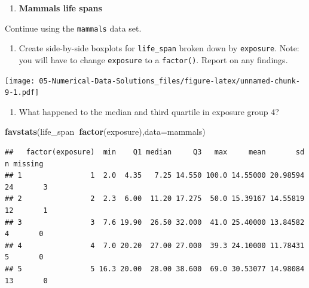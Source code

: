 \documentclass[
]{book}
\newenvironment{Shaded}{\begin{snugshade}}{\end{snugshade}}
\newcommand{\DataTypeTok}[1]{\textcolor[rgb]{0.13,0.29,0.53}{#1}}
\newcommand{\KeywordTok}[1]{\textcolor[rgb]{0.13,0.29,0.53}{\textbf{#1}}}
\newcommand{\NormalTok}[1]{#1}
\newcommand{\OperatorTok}[1]{\textcolor[rgb]{0.81,0.36,0.00}{\textbf{#1}}}
\providecommand{\tightlist}{%
  \setlength{\itemsep}{0pt}\setlength{\parskip}{0pt}}
\begin{document}
\begin{enumerate}
\def\labelenumi{\arabic{enumi}.}
\setcounter{enumi}{1}
\tightlist
\item
  \textbf{Mammals life spans}
\end{enumerate}

Continue using the \texttt{mammals} data set.

\begin{enumerate}
\def\labelenumi{\alph{enumi}.}
\tightlist
\item
  Create side-by-side boxplots for \texttt{life\_span} broken down by \texttt{exposure}. Note: you will have to change \texttt{exposure} to a \texttt{factor()}. Report on any findings.
\end{enumerate}

\begin{Shaded}
\end{Shaded}

\texttt{[image: 05-Numerical-Data-Solutions\_files/figure-latex/unnamed-chunk-9-1.pdf]}

\begin{enumerate}
\def\labelenumi{\alph{enumi}.}
\setcounter{enumi}{1}
\tightlist
\item
  What happened to the median and third quartile in exposure group 4?
\end{enumerate}

\begin{Shaded}
\begin{Highlighting}[]
\KeywordTok{favstats}\NormalTok{(life_span}\OperatorTok{~}\KeywordTok{factor}\NormalTok{(exposure),}\DataTypeTok{data=}\NormalTok{mammals)}
\end{Highlighting}
\end{Shaded}

\begin{verbatim}
##   factor(exposure)  min    Q1 median     Q3   max     mean       sd  n missing
## 1                1  2.0  4.35   7.25 14.550 100.0 14.55000 20.98594 24       3
## 2                2  2.3  6.00  11.20 17.275  50.0 15.39167 14.55819 12       1
## 3                3  7.6 19.90  26.50 32.000  41.0 25.40000 13.84582  4       0
## 4                4  7.0 20.20  27.00 27.000  39.3 24.10000 11.78431  5       0
## 5                5 16.3 20.00  28.00 38.600  69.0 30.53077 14.98084 13       0
\end{verbatim}
\end{document}
